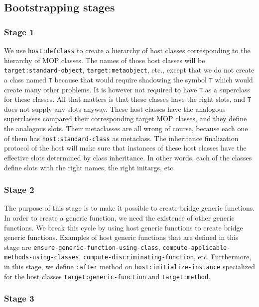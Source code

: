\subsection{Bootstrapping stages}

\subsubsection{Stage 1}

We use \texttt{host:defclass} to create a hierarchy of host classes
corresponding to the hierarchy of MOP classes.  The names of those host
classes will be \texttt{target:standard-object},
\texttt{target:metaobject}, etc., except that we do not create a class
named \texttt{T} because that would require shadowing the symbol
\texttt{T} which would create many other problems.  It is however not
required to have \texttt{T} as a superclass for these classes.  All
that matters is that these classes have the right slots, and
\texttt{T} does not supply any slots anyway.  These host classes have
the analogous superclasses compared their corresponding target MOP
classes, and they define the analogous slots.  Their metaclasses are
all wrong of course, because each one of them has
\texttt{host:standard-class} as metaclass.  The inheritance
finalization protocol of the host will make sure that instances of
these host classes have the effective slots determined by class
inheritance.  In other words, each of the classes define slots with
the right names, the right initargs, etc.

\subsubsection{Stage 2}

The purpose of this stage is to make it possible to create bridge
generic functions.  In order to create a generic function, we need the
existence of other generic functions.  We break this cycle by using
host generic functions to create bridge generic functions.  Examples 
of host generic functions that are defined in this stage are
\texttt{ensure-generic-function-using-class},
\texttt{compute-applicable-methods-using-classes},
\texttt{compute-discriminating-function}, etc.  Furthermore, in this
stage, we define \texttt{:after} method on
\texttt{host:initialize-instance} specialized for the host classes
\texttt{target:generic-function} and \texttt{target:method}.  

\subsubsection{Stage 3}

